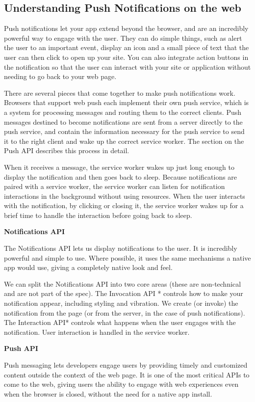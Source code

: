 \documentclass[14pt,a4paper,final]{extreport}
\begin{document}
\subsection{Understanding Push Notifications on the web}\item Push notifications let your app extend beyond the browser, and are an incredibly powerful way to engage with the user. They can do simple things, such as alert the user to an important event, display an icon and a small piece of text that the user can then click to open up your site. You can also integrate action buttons in the notification so that the user can interact with your site or application without needing to go back to your web page.

There are several pieces that come together to make push notifications work. Browsers that support web push each implement their own push service, which is a system for processing messages and routing them to the correct clients. Push messages destined to become notifications are sent from a server directly to the push service, and contain the information necessary for the push service to send it to the right client and wake up the correct service worker. The section on the Push API describes this process in detail.

When it receives a message, the service worker wakes up just long enough to display the notification and then goes back to sleep. Because notifications are paired with a service worker, the service worker can listen for notification interactions in the background without using resources. When the user interacts with the notification, by clicking or closing it, the service worker wakes up for a brief time to handle the interaction before going back to sleep.
\item \textbf{Notifications API }
\item The Notifications API lets us display notifications to the user. It is incredibly powerful and simple to use. Where possible, it uses the same mechanisms a native app would use, giving a completely native look and feel.
\item We can split the Notifications API into two core areas (these are non-technical and are not part of the spec). The Invocation API * controls how to make your notification appear, including styling and vibration. We create (or invoke) the notification from the page (or from the server, in the case of push notifications). The Interaction API* controls what happens when the user engages with the notification. User interaction is handled in the service worker.
\item \textbf{Push API }
\item Push messaging lets developers engage users by providing timely and customized content outside the context of the web page. It is one of the most critical APIs to come to the web, giving users the ability to engage with web experiences even when the browser is closed, without the need for a native app install.
\end{document}
